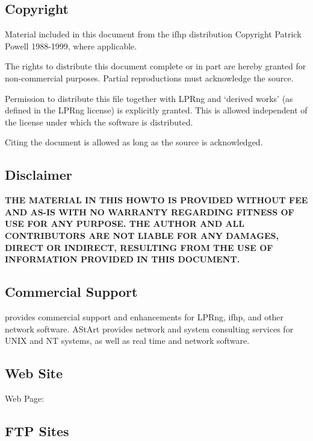 \documentclass[a4paper]{article}
\begin{document}
\subsection{Copyright}

Material included in this document from the {\ttfamily ifhp} distribution
Copyright Patrick Powell 1988-1999, where applicable.

The rights to distribute this document complete or in part are hereby
granted for non-commercial purposes. Partial reproductions must
acknowledge the source.

Permission to distribute this file together with LPRng and `derived
works' (as defined in the LPRng license) is explicitly granted. This
is allowed independent of the license under which the software is
distributed.

Citing the document is allowed as long as the source is acknowledged.


\subsection{Disclaimer}

{\bfseries THE MATERIAL IN THIS HOWTO IS PROVIDED WITHOUT FEE AND AS-IS WITH NO
WARRANTY REGARDING FITNESS OF USE FOR ANY PURPOSE. THE AUTHOR AND ALL
CONTRIBUTORS ARE NOT LIABLE FOR ANY DAMAGES, DIRECT OR INDIRECT,
RESULTING FROM THE USE OF INFORMATION PROVIDED IN THIS DOCUMENT.}


\subsection{Commercial Support}

provides commercial support and enhancements for
LPRng, {\ttfamily ifhp}, and other network software.
AStArt provides network and system consulting services for UNIX and NT
systems, as well as real time and network software.


\subsection{Web Site}

Web Page:

\label{secftp}


\subsection{FTP Sites}
\end{document}
